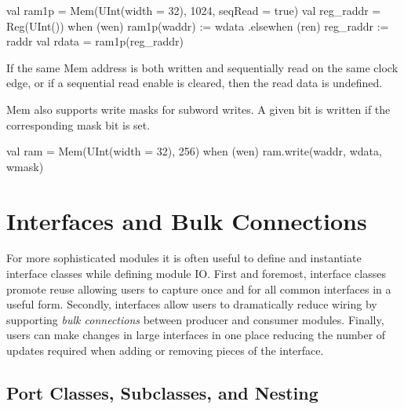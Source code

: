 \documentclass[twocolumn,10pt]{article}
\begin{document}
\begin{scala}
val ram1p = 
  Mem(UInt(width = 32), 1024, seqRead = true)
val reg_raddr = Reg(UInt())
when (wen) { ram1p(waddr) := wdata }
.elsewhen (ren) { reg_raddr := raddr }
val rdata = ram1p(reg_raddr)
\end{scala}

If the same Mem address is both written and sequentially read on the same clock
edge, or if a sequential read enable is cleared, then the read data is
undefined.

Mem also supports write masks for subword writes.  A given bit is written if
the corresponding mask bit is set.

\begin{scala}
val ram = Mem(UInt(width = 32), 256)
when (wen) { ram.write(waddr, wdata, wmask) }
\end{scala}


% 
% 


\section{Interfaces and Bulk Connections}
\label{sec:interfaces}

For more sophisticated modules it is often useful to define and
instantiate interface classes while defining module IO.  First and
foremost, interface classes promote reuse allowing users to capture
once and for all common interfaces in a useful form.  Secondly,
interfaces allow users to dramatically reduce wiring by supporting
{\em bulk connections} between producer and consumer modules.  Finally,
users can make changes in large interfaces in one place reducing the
number of updates required when adding or removing pieces of the
interface.

\subsection{Port Classes, Subclasses, and Nesting}
\end{document}
